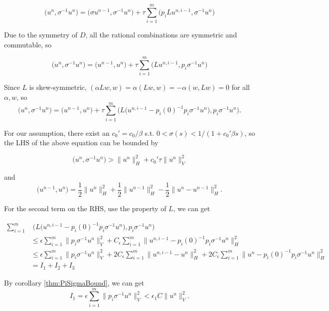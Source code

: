 $$\big(u^n, \sigma^{-1}u^n\big) = \big(\sigma u^{n-1}, \sigma^{-1}u^n\big) +\tau \sum_{i=1}^m \big(p_iL u^{n,i-1}, \sigma^{-1}u^n\big)$$

Due to the symmetry of $D$, all the rational combinations are symmetric and commutable, so 

$$\big(u^n, \sigma^{-1}u^n\big) = \big( u^{n-1}, u^n\big) +\tau \sum_{i=1}^m  \big(L u^{n,i-1},p_i \sigma^{-1}u^n\big)$$

Since $L$ is skew-symmetric, $(\alpha Lw,w) = \alpha(Lw, w)=-\alpha(w, Lw) = 0$ for all $\alpha, w$,
so
$$\big(u^n, \sigma^{-1}u^n\big)  = \big( u^{n-1}, u^n\big) +
\tau \sum_{i=1}^m  \bigg(L\big(u^{n,i-1}-p_i(0)^{-1}p_i \sigma^{-1}u^n\big),p_i \sigma^{-1}u^n\bigg).$$

For our assumption, there exist an $c_0' = c_0 /\beta$ s.t. $0 < \sigma(s) <1/(1+c_0'\beta s)$, so the LHS
of the above equation can be bounded by

$$\big(u^n, \sigma^{-1}u^n\big) > \big\|u^n\big\|_H^2 + c_0'\tau\big\|u^n\big\|_V^2$$

and
$$\big(u^{n-1}, u^n\big) = \frac12\big\|u^n\big\|_H^2+\frac12\big\|u^{n-1}\big\|_H^2-\frac12\big\|u^n-u^{n-1}\big\|_H^2.$$

For the second term on the RHS, use the property of $L$, we can get

\begin{align*}
\sum_{i=1}^m & \;\bigg(L\big(u^{n,i-1}-p_i(0)^{-1}p_i \sigma^{-1}u^n\big),p_i \sigma^{-1}u^n\bigg)\\
&\leq \epsilon \sum_{i=1}^m\big\|p_i \sigma^{-1}u^n\big\|_V^2
+ C_\epsilon \sum_{i=1}^m\big\|u^{n,i-1}-p_i(0)^{-1}p_i \sigma^{-1}u^n\big\|_H^2\\
&\leq \epsilon \sum_{i=1}^m\big\|p_i \sigma^{-1}u^n\big\|_V^2
+ 2C_\epsilon \sum_{i=1}^m\big\|u^{n,i-1}-u^n\big\|_H^2 +2C_\epsilon \sum_{i=1}^m\big\|u^n-p_i(0)^{-1}p_i \sigma^{-1}u^n\big\|_H^2\\
&=I_1+I_2+I_3
\end{align*}

By corollary \ref{thm:PiSigmaBound}, we can get
$$I_1 = \epsilon \sum_{i=1}^m\big\|p_i \sigma^{-1}u^n\big\|_V^2 < \epsilon_1 C \big\|u^n\big\|_V^2.$$

